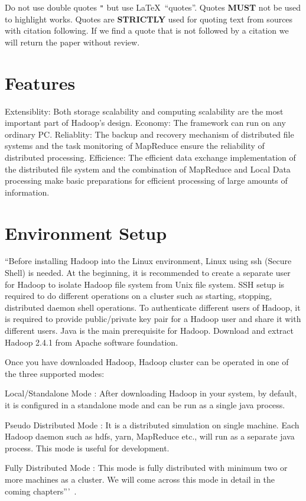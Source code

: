 Do not use double quotes \verb|"| but use \LaTeX\ ``quotes''. Quotes
{\bf MUST} not be used to highlight works. Quotes are {\bf STRICTLY}
used for quoting text from sources with citation following. If we find
a quote that is not followed by a citation we will return the paper
without review.

\section{Features}
Extensiblity: Both storage scalability and computing scalability are the most important part of Hadoop's design.
Economy: The framework can run on any ordinary PC.
Reliablity: The backup and recovery mechanism of distributed file systems and the task monitoring of MapReduce ensure the reliability of distributed processing.
Efficience: The efficient data exchange implementation of the distributed file system and the combination of MapReduce and Local Data processing make basic preparations for efficient processing of large amounts of information.


\section{Environment Setup}
``Before installing Hadoop into the Linux environment,  Linux using ssh (Secure Shell) is needed. At the beginning, it is recommended to create a separate user for Hadoop to isolate Hadoop file system from Unix file system. SSH setup is required to do different operations on a cluster such as starting, stopping, distributed daemon shell operations. To authenticate different users of Hadoop, it is required to provide public/private key pair for a Hadoop user and share it with different users. Java is the main prerequisite for Hadoop. Download and extract Hadoop 2.4.1 from Apache software foundation. 

Once you have downloaded Hadoop, Hadoop cluster can be operated in one of the three supported modes:

Local/Standalone Mode : After downloading Hadoop in your system, by default, it is configured in a standalone mode and can be run as a single java process.

Pseudo Distributed Mode : It is a distributed simulation on single machine. Each Hadoop daemon such as hdfs, yarn, MapReduce etc., will run as a separate java process. This mode is useful for development.

Fully Distributed Mode : This mode is fully distributed with minimum two or more machines as a cluster. We will come across this mode in detail in the coming chapters'''~\cite{hadoop}. 


